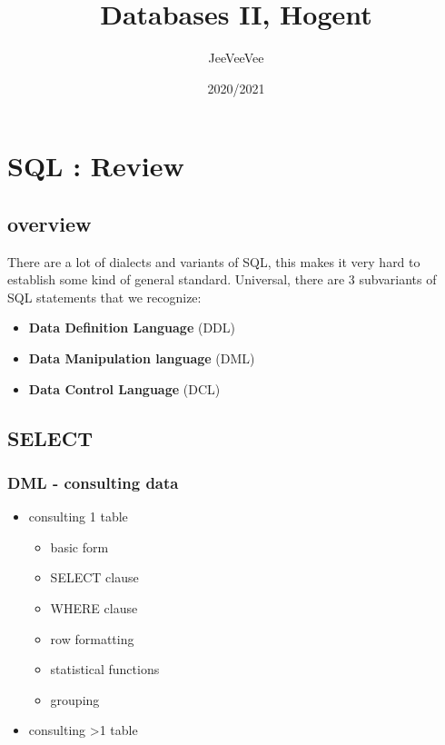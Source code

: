 \documentclass{report}
\title{Databases II, Hogent}
\author{JeeVeeVee}
\date{2020/2021}
\begin{document}
   \maketitle
   \tableofcontents
   
   \chapter{SQL : Review}
   \section{overview}
   
   There are a lot of dialects and variants of SQL, this makes it very hard to establish some kind of general standard. Universal, there are 3 subvariants of SQL statements that we recognize: 
  
   \begin{itemize}
   	\item \textbf{Data Definition Language} (DDL) 
   	\item \textbf{Data Manipulation language} (DML)
   	\item \textbf{Data Control Language} (DCL)
   \end{itemize}

	\section{SELECT}
	\subsection{DML - consulting data}
	\begin{itemize}
		\item consulting 1 table
		\begin{itemize}
			\item basic form
			\item SELECT clause
			\item WHERE clause
			\item row formatting
			\item statistical functions
			\item grouping
		\end{itemize}
		\item consulting \textgreater 1 table
	\end{itemize}
\end{document}

